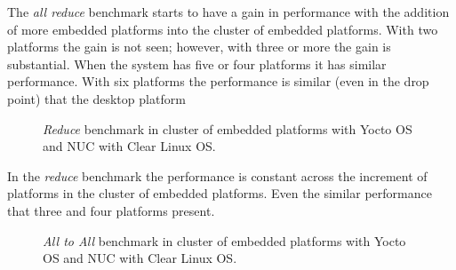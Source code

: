 The \textit{all reduce} benchmark starts to have a gain in performance with the
addition of more embedded platforms into the cluster of embedded platforms.
With two platforms the gain is not seen; however, with three or more the gain is
substantial.  When the system has five or four platforms it has similar
performance. With six platforms the performance is similar (even in the drop
point) that the desktop platform \cite{NUC}

\begin{figure}[H]
\begin{center}
\end{center}
\caption{\textit{Reduce} benchmark in cluster of embedded platforms with Yocto OS and NUC
with Clear Linux OS.}
\label{reduce_cluster}
\end{figure}

In the \textit{reduce} benchmark the performance is constant across the
increment of platforms in the cluster of embedded platforms. Even the similar
performance that three and four platforms present.

\begin{figure}[H]
\begin{center}
\end{center}
\caption{\textit{All to All} benchmark in cluster of embedded platforms with Yocto OS and NUC
with Clear Linux OS.}
\label{all_to_all_cluster}
\end{figure}

